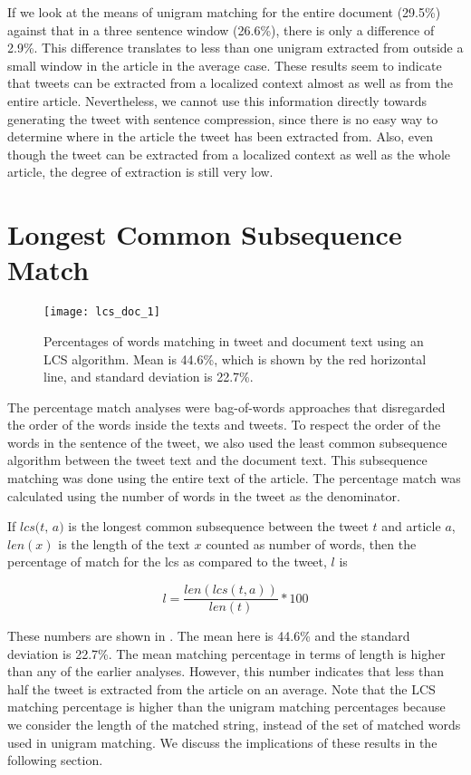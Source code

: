If we look at the means of unigram matching for the entire document (29.5\%) against that in a three sentence window (26.6\%), there is only a difference of 2.9\%. This difference translates to less than one unigram extracted from outside a small window in the article in the average case. These results seem to indicate that tweets can be extracted from a localized context almost as well as from the entire article. Nevertheless, we cannot use this information directly towards generating the tweet with sentence compression, since there is no easy way to determine where in the article the tweet has been extracted from. Also, even though the tweet can be extracted from a localized context as well as the whole article, the degree of extraction is still very low. 

\section{Longest Common Subsequence Match}
\label{sec:lcs}

\begin{figure}[!t]
\centering
\texttt{[image: lcs\_doc\_1]}
\caption[LCS match percentages]{Percentages of words matching in tweet and document text using an LCS algorithm. Mean is 44.6\%, which is shown by the red horizontal line, and standard deviation is 22.7\%.}
\label{fig:lcs}
\end{figure}

The percentage match analyses were bag-of-words approaches that disregarded the order of the words inside the texts and tweets. To respect the order of the words in the sentence of the tweet, we also used the least common subsequence algorithm between the tweet text and the document text. This subsequence matching was done using the entire text of the article. The percentage match was calculated using the number of words in the tweet as the denominator.

If $\textit{lcs(t, a)}$ is the longest common subsequence between the tweet $t$ and article $a$, $len(x)$ is the length of the text $x$ counted as number of words, then the percentage of match for the lcs as compared to the tweet, $\textit{l}$ is


\begin{equation}
l = \frac{len( \textit{lcs}(t, a) )}{len(t )} * 100
\end{equation}


These numbers are shown in . The mean here is 44.6\% and the standard deviation is 22.7\%. The mean matching percentage in terms of length is higher than any of the earlier analyses. However, this number indicates that less than half the tweet is extracted from the article on an average. Note that the LCS matching percentage is higher than the unigram matching percentages because we consider the length of the matched string, instead of the set of matched words used in unigram matching. We discuss the implications of these results in the following section. 


